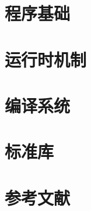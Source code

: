 




\tableofcontents

\part{程序基础}


\part{运行时机制}




\part{编译系统}
\part{标准库}


\part*{参考文献}
\nocite{*}


